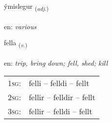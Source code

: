 \documentclass[frontgrid, backgrid]{flacards}\usepackage[]{graphicx}\usepackage[]{color}
\begin{document}
\renewcommand{\flhead}{\vskip5pt \fboxsep=0pt {\small\bfseries\footnotesize Lýsingarorð | Adjective}}
\renewcommand{\fcfoot}{\vskip5pt \fboxsep=0pt \hspace{2pt}{\small\bfseries\footnotesize 2K}}

\renewcommand{\blhead}{\vskip5pt {\small\bfseries\footnotesize Lýsingarorð | Adjective }}
\renewcommand{\bcfoot}{\vskip5pt \hspace{2pt}{\small\bfseries\footnotesize 2K}}


{ýmislegur \small{\textsubscript{(\textit{adj.})}} \\[1ex] %
\textphonetic{[iːmɪstlɛɣʏr]} \\
en: \emph{various} \\  [2ex]
\renewcommand*{\arraystretch}{0.8}
}

\renewcommand{\flhead}{\vskip5pt \fboxsep=0pt {\small\bfseries\footnotesize Sagnorð | Verb}}
\renewcommand{\fcfoot}{\vskip5pt \fboxsep=0pt \hspace{2pt}{\small\bfseries\footnotesize 2K}}

\renewcommand{\blhead}{\vskip5pt {\small\bfseries\footnotesize Sagnorð | Verb }}
\renewcommand{\bcfoot}{\vskip5pt \hspace{2pt}{\small\bfseries\footnotesize 2K}}


{fella \small{\textsubscript{(\textit{v.})}} \\[1ex] %
\textphonetic{[fɛtla]} \\
en: \emph{trip, bring down; fell, shed; kill} \\  [2ex]
\renewcommand*{\arraystretch}{0.8}
\begin{tabular}{p{1cm}l}
\textsc{1sg}: & felli -- felldi -- fellt \\ 
\textsc{2sg}: & fellir -- felldir -- fellt \\ 
\textsc{3sg}: & fellir -- felldi -- fellt \\ 
\end{tabular}
}
\end{document}
